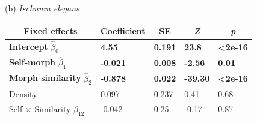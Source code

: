\documentclass[12pt,]{article}
\begin{document}
\begin{table}[ht]
(b) \textit{Ischnura elegans} \\
\begin{tabular}{lllll}
\hline
\multicolumn{1}{c}{Fixed effects} & \multicolumn{1}{c}{Coefficient} & \multicolumn{1}{c}{SE} & \multicolumn{1}{c}{\textit{Z}} & \multicolumn{1}{c}{\textit{p}} \\ \hline
\textbf{Intercept} $\hat{\beta}_{0}$    & \textbf{4.55} &  \textbf{0.191} & \textbf{23.8}  & \textbf{\textless{}2e-16}  \\
\textbf{Self-morph} $\hat{\beta}_{1}$               & \textbf{-0.021}                 & \textbf{0.008}         & \textbf{-2.56}                 & \textbf{0.01}                  \\
\textbf{Morph similarity} $\hat{\beta}_{2}$           & \textbf{-0.878}                 & \textbf{0.022}         & \textbf{-39.30}                & \textbf{\textless{}2e-16}      \\
Density                             & 0.097                           & 0.237                  & 0.41                           & 0.68                           \\
Self $\times$ Similarity $\hat{\beta}_{12}$                 & -0.042                          & 0.25                 & -0.17                          & 0.87                           \\ \hline
\end{tabular}
\label{table1:GLMM}
\end{table}
\end{document}

